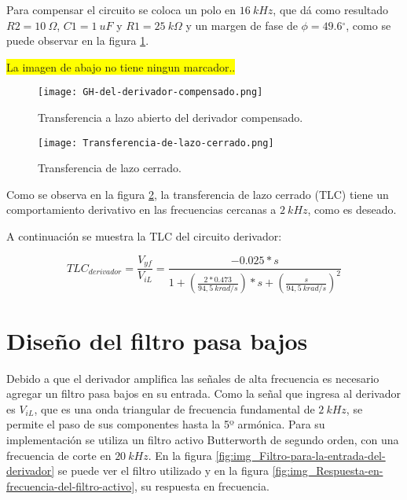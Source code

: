 \noindent Para compensar el circuito se coloca un polo en $16 \:kHz$, que dá como resultado $R2=10\:\Omega$, $C1=1\:uF$ y $R1=25\: k\Omega$ y un margen de fase de $\phi =49.6{}^\circ $, como se puede observar en la figura \ref{fig:img_GH del derivador compensado}.

\colorbox{yellow}{La imagen de abajo no tiene ningun marcador..}\

\begin{figure}[H]
	\centering
	\texttt{[image: GH-del-derivador-compensado.png]}
	\caption{Transferencia a lazo abierto del derivador compensado.}
	\label{fig:img_GH del derivador compensado}
\end{figure}

\begin{figure}[H]
	\centering
	\texttt{[image: Transferencia-de-lazo-cerrado.png]}
	\caption{Transferencia de lazo cerrado.}
	\label{fig:img_Transferencia-de-lazo-cerrado}
\end{figure}

\noindent Como se observa en la figura \ref{fig:img_Transferencia-de-lazo-cerrado}, la transferencia de lazo cerrado (TLC) tiene un comportamiento derivativo en las frecuencias cercanas a $2 \:kHz$, como es deseado.

\noindent A continuaci\'{o}n se muestra la TLC del circuito derivador:
 
\begin{equation} \label{eq_Vyf-lineal}
	{TLC}_{derivador}=\frac{V_{yf}}{V_{iL}}=\frac{-0.025*s}{1+(\frac{2*0.473}{94,5\ krad/s})*s+(\frac{s}{94,5\ krad/s})^2}
\end{equation} 

\section{Dise\~{n}o del filtro pasa bajos}

\noindent Debido a que el derivador amplifica las se\~{n}ales de alta frecuencia es necesario agregar un filtro pasa bajos en su entrada. Como la se\~{n}al que ingresa al derivador es $V_{iL}$, que es una onda triangular de frecuencia fundamental de $2\:kHz$, se permite el paso de sus componentes hasta la 5º arm\'{o}nica. Para su implementaci\'{o}n se utiliza un filtro activo Butterworth de segundo orden, con una frecuencia de corte en $20\:kHz$. En la figura  \ref{fig:img_Filtro-para-la-entrada-del-derivador} se puede ver el filtro utilizado y en la figura \ref{fig:img_Respuesta-en-frecuencia-del-filtro-activo}, su respuesta en frecuencia.

